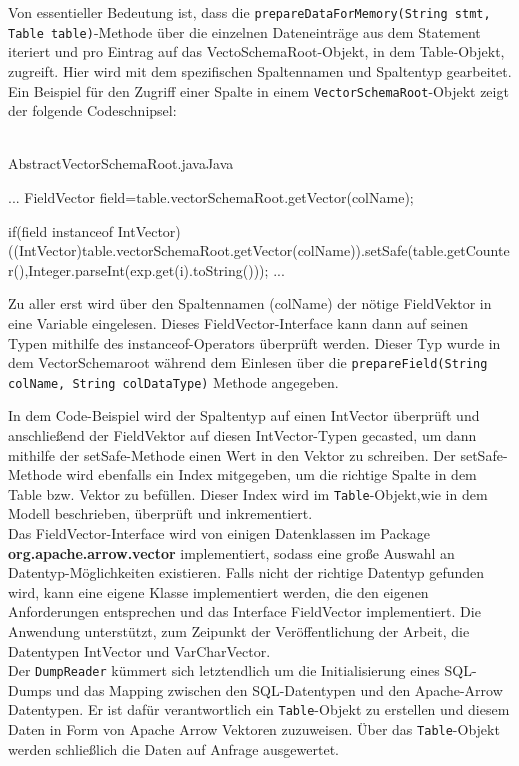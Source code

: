 Von essentieller Bedeutung ist, dass die \texttt{prepareDataForMemory(String stmt, Table table)}-Methode über die einzelnen Dateneinträge aus dem Statement iteriert und pro Eintrag auf das VectoSchemaRoot-Objekt, in dem Table-Objekt, zugreift. Hier wird mit dem spezifischen Spaltennamen und Spaltentyp gearbeitet.
\\
Ein Beispiel für den Zugriff einer Spalte in einem \texttt{VectorSchemaRoot}-Objekt zeigt der folgende Codeschnipsel:\\\\

\begin{codeblock}{AbstractVectorSchemaRoot.java}{Java}
  \begin{javacode}
    ...
    FieldVector field=table.vectorSchemaRoot.getVector(colName);

    if(field instanceof IntVector){
      ((IntVector)table.vectorSchemaRoot.getVector(colName)).setSafe(table.getCounter(),Integer.parseInt(exp.get(i).toString()));
	}    
    ...
  \end{javacode}
\end{codeblock}

Zu aller erst wird über den Spaltennamen (colName) der nötige FieldVektor in eine Variable eingelesen. Dieses FieldVector-Interface kann dann auf seinen Typen mithilfe des instanceof-Operators überprüft werden. Dieser Typ wurde in dem VectorSchemaroot während dem Einlesen über die \texttt{prepareField(String colName, String colDataType)} Methode angegeben.


In dem Code-Beispiel wird der Spaltentyp auf einen IntVector überprüft und anschließend der FieldVektor auf diesen IntVector-Typen gecasted, um dann mithilfe der setSafe-Methode einen Wert in den Vektor zu schreiben.
Der setSafe-Methode wird ebenfalls ein Index mitgegeben, um  die richtige Spalte in dem Table bzw. Vektor zu befüllen. Dieser Index wird im \texttt{Table}-Objekt,wie in dem Modell beschrieben, überprüft und inkrementiert.
\\
Das FieldVector-Interface wird von einigen Datenklassen im Package \\ \textbf{org.apache.arrow.vector} implementiert, sodass eine große Auswahl an Datentyp-Möglichkeiten existieren. Falls nicht der richtige Datentyp gefunden wird, kann eine eigene Klasse implementiert werden, die den eigenen Anforderungen entsprechen und das Interface FieldVector implementiert.
Die Anwendung unterstützt, zum Zeipunkt der Veröffentlichung der Arbeit, die Datentypen IntVector und VarCharVector.
\\
Der \texttt{DumpReader} kümmert sich letztendlich um die Initialisierung eines SQL-Dumps und das Mapping zwischen den SQL-Datentypen und den Apache-Arrow Datentypen. Er ist dafür verantwortlich ein \texttt{Table}-Objekt zu erstellen und diesem Daten  in Form von Apache Arrow Vektoren zuzuweisen.
Über das \texttt{Table}-Objekt werden schließlich die Daten auf Anfrage ausgewertet.





